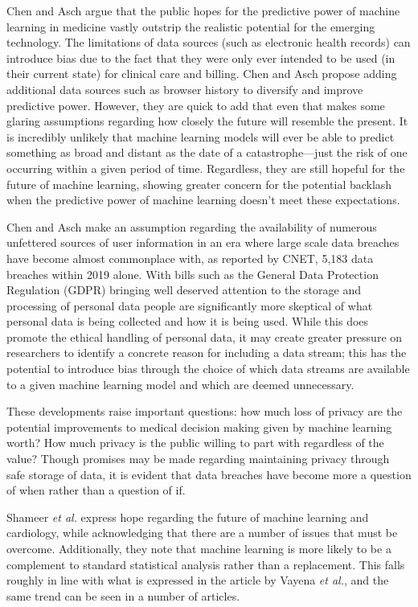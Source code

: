 \documentclass[]{article}
\begin{document}
			Chen and Asch argue that the public hopes for the predictive power of machine learning in medicine vastly outstrip the realistic potential for the emerging technology. The limitations of data sources (such as electronic health records) can introduce bias\cite{Gianfrancesco2018} due to the fact that they were only ever intended to be used (in their current state) for clinical care and billing. Chen and Asch propose adding additional data sources such as browser history to diversify and improve predictive power. However, they are quick to add that even that makes some glaring assumptions regarding how closely the future will resemble the present. It is incredibly unlikely that machine learning models will ever be able to predict something as broad and distant as the date of a catastrophe---just the risk of one occurring within a given period of time. Regardless, they are still hopeful for the future of machine learning, showing greater concern for the potential backlash when the predictive power of machine learning doesn't meet these expectations.\cite{Chen2017}

			Chen and Asch make an assumption regarding the availability of numerous unfettered sources of user information in an era where large scale data breaches have become almost commonplace with, as reported by CNET, 5,183 data breaches within 2019 alone.\cite{cnet2019databreaches} With bills such as the General Data Protection Regulation (GDPR) bringing well deserved attention to the storage and processing of personal data people are significantly more skeptical of what personal data is being collected and how it is being used.\cite{Vayena2018} While this does promote the ethical handling of personal data, it may create greater pressure on researchers to identify a concrete reason for including a data stream; this has the potential to introduce bias through the choice of which data streams are available to a given machine learning model and which are deemed unnecessary.\cite{Gianfrancesco2018}
			
			These developments raise important questions: how much loss of privacy are the potential improvements to medical decision making given by machine learning worth? How much privacy is the public willing to part with regardless of the value? Though promises may be made regarding maintaining privacy through safe storage of data, it is evident that data breaches have become more a question of when rather than a question of if.

			Shameer \emph{et al.} express hope regarding the future of machine learning and cardiology, while acknowledging that there are a number of issues that must be overcome. Additionally, they note that machine learning is more likely to be a complement to standard statistical analysis rather than a replacement.\cite{Shameer1156} This falls roughly in line with what is expressed in the article by Vayena \emph{et al.}\cite{Vayena2018}, and the same trend can be seen in a number of articles.\cite{Shah2018,WU201868}
\end{document}
